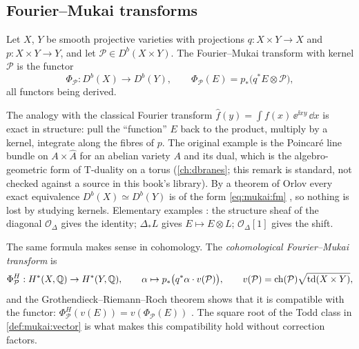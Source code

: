 \subsection{Fourier--Mukai transforms}
\begin{definition}\label{def:mukai:fm}
Let $X$, $Y$ be smooth projective varieties with projections $q:X\times Y\to X$ and
$p:X\times Y\to Y$, and let $\mathcal P\in D^b(X\times Y)$. The Fourier--Mukai transform with
kernel $\mathcal P$ is the functor
\begin{equation}\label{eq:mukai:fm}
  \Phi_{\mathcal P}:D^b(X)\to D^b(Y),\qquad
  \Phi_{\mathcal P}(E)=p_*\bigl(q^*E\otimes\mathcal P\bigr),
\end{equation}
all functors being derived. 
\end{definition}
The analogy with the classical Fourier transform $\hat f(y)=\int f(x)\,\ee^{\ii xy}\,\dd x$ is
exact in structure: pull the ``function'' $E$ back to the product, multiply by a kernel,
integrate along the fibres of $p$. The original example is the Poincar\'e line bundle on
$A\times\hat A$ for an abelian variety $A$ and its dual, which is the algebro-geometric form of
T-duality on a torus (\cref{ch:dbranes}; this remark is standard, not checked against a source in
this book's library). By a theorem of Orlov every exact equivalence
$D^b(X)\simeq D^b(Y)$ is of the form \eqref{eq:mukai:fm}
, so nothing is lost by studying kernels. Elementary
examples : the structure sheaf of the diagonal
$\mathcal O_\Delta$ gives the identity; $\Delta_*L$ gives $E\mapsto E\otimes L$;
$\mathcal O_\Delta[1]$ gives the shift.

The same formula makes sense in cohomology. The \emph{cohomological Fourier--Mukai transform}
is
\begin{equation}\label{eq:mukai:fmH}
  \Phi^H_{\mathcal P}:H^*(X,\mathbb{Q})\to H^*(Y,\mathbb{Q}),\qquad
  \alpha\mapsto p_*\bigl(q^*\alpha\cdot v(\mathcal P)\bigr),\qquad
  v(\mathcal P)=\operatorname{ch}(\mathcal P)\sqrt{\operatorname{td}(X\times Y)},
\end{equation}
and the Grothendieck--Riemann--Roch theorem shows that it is compatible with the functor:
$\Phi^H_{\mathcal P}(v(E))=v(\Phi_{\mathcal P}(E))$ . The square root of the Todd class in \cref{def:mukai:vector} is what makes
this compatibility hold without correction factors.

